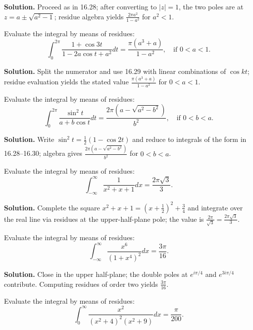 \noindent\textbf{Solution.}
Proceed as in 16.28; after converting to $|z|=1$, the two poles are at $z=a\pm\sqrt{a^2-1}$; residue algebra yields $\frac{2\pi a^2}{1-a^2}$ for $a^2<1$.

\begin{problembox}
Evaluate the integral by means of residues:
\[ \int_0^{2\pi} \frac{1 + \cos 3t}{1 - 2a \cos t + a^2} dt = \frac{\pi (a^3 + a)}{1 - a^2}, \quad \text{if } 0 < a < 1. \]
\end{problembox}

\noindent\textbf{Solution.}
Split the numerator and use 16.29 with linear combinations of $\cos kt$; residue evaluation yields the stated value $\frac{\pi(a^3+a)}{1-a^2}$ for $0<a<1$.

\begin{problembox}
Evaluate the integral by means of residues:
\[ \int_0^{2\pi} \frac{\sin^2 t}{a + b \cos t} dt = \frac{2\pi (a - \sqrt{a^2 - b^2})}{b^2}, \quad \text{if } 0 < b < a. \]
\end{problembox}

\noindent\textbf{Solution.}
Write $\sin^2 t=\tfrac{1}{2}(1-\cos 2t)$ and reduce to integrals of the form in 16.28–16.30; algebra gives $\frac{2\pi(a-\sqrt{a^2-b^2})}{b^2}$ for $0<b<a$.

\begin{problembox}
Evaluate the integral by means of residues:
\[ \int_{-\infty}^{\infty} \frac{1}{x^2 + x + 1} dx = \frac{2\pi \sqrt{3}}{3}. \]
\end{problembox}

\noindent\textbf{Solution.}
Complete the square $x^2+x+1=(x+\tfrac12)^2+\tfrac34$ and integrate over the real line via residues at the upper-half-plane pole; the value is $\frac{2\pi}{\sqrt{3}}=\frac{2\pi\sqrt{3}}{3}$.

\begin{problembox}
Evaluate the integral by means of residues:
\[ \int_{-\infty}^{\infty} \frac{x^6}{(1 + x^4)^2} dx = \frac{3\pi}{16}. \]
\end{problembox}

\noindent\textbf{Solution.}
Close in the upper half-plane; the double poles at $e^{i\pi/4}$ and $e^{3i\pi/4}$ contribute. Computing residues of order two yields $\frac{3\pi}{16}$.

\begin{problembox}
Evaluate the integral by means of residues:
\[ \int_0^{\infty} \frac{x^2}{(x^2 + 4)^2 (x^2 + 9)} dx = \frac{\pi}{200}. \]
\end{problembox}

